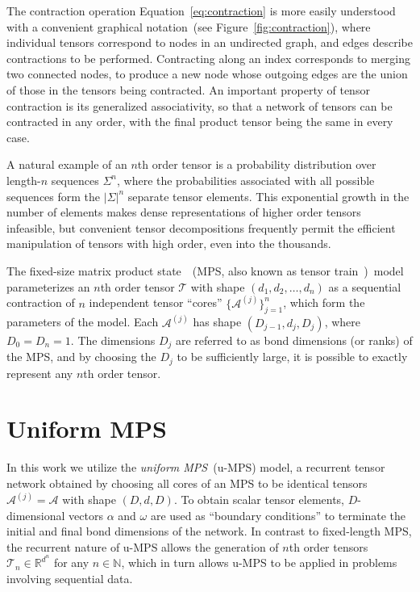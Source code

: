 \documentclass[twoside]{article}
\newcommand{\eqnref}[1]{Equation~\ref{#1}}
\newcommand{\R}{\mathbb{R}}
\newcommand{\mc}[1]{\mathcal{#1}}
\newcommand{\seq}[2]{{#1}_{1}, {#1}_{2}, \ldots, {#1}_{#2}}
\begin{document}
%
The contraction operation \eqnref{eq:contraction} is more easily understood with a convenient graphical notation~(see Figure~\ref{fig:contraction}), where individual tensors correspond to nodes in an undirected graph, and edges describe contractions to be performed. Contracting along an index corresponds to merging two connected nodes, to produce a new node whose outgoing edges are the union of those in the tensors being contracted. An important property of tensor contraction is its generalized associativity, so that a network of tensors can be contracted in any order, with the final product tensor being the same in every case.

A natural example of an $n$th order tensor is a probability distribution over length-$n$ sequences $\Sigma^n$, where the probabilities associated with all possible sequences form the $|\Sigma|^n$ separate tensor elements. This exponential growth in the number of elements makes dense representations of higher order tensors infeasible, but convenient tensor decompositions frequently permit the efficient manipulation of tensors with high order, even into the thousands.

The fixed-size matrix product state~\citep{perez2007}~(MPS, also known as tensor train~\citep{oseledets2011})~model parameterizes an $n$th order tensor $\mc{T}$ with shape $(\seq{d}{n})$ as a sequential contraction of $n$ independent tensor ``cores'' $\{\mc{A}^{(j)}\}_{j=1}^n$, which form the parameters of the model. Each $\mc{A}^{(j)}$ has shape $(D_{j-1}, d_j, D_j)$, where $D_0 = D_n = 1$. The dimensions $D_j$ are referred to as bond dimensions (or ranks) of the MPS, and by choosing the $D_j$ to be sufficiently large, it is possible to exactly represent any $n$th order tensor.

\section{Uniform MPS}
\label{sec:umps}

In this work we utilize the \emph{uniform MPS}~(u-MPS) model, a recurrent tensor network obtained by choosing all cores of an MPS to be identical tensors $\mc{A}^{(j)} = \mc{A}$ with shape $(D, d, D)$. To obtain scalar tensor elements, $D$-dimensional vectors $\alpha$ and $\omega$ are used as ``boundary conditions'' to terminate the initial and final bond dimensions of the network. In contrast to fixed-length MPS, the recurrent nature of u-MPS allows the generation of $n$th order tensors $\mc{T}_n\in\R^{d^n}$ for any $n\in\mathbb{N}$, which in turn allows u-MPS to be applied in problems involving sequential data. 
\end{document}
